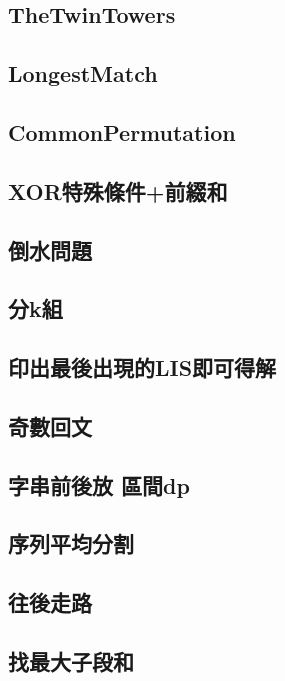 \subsection{TheTwinTowers}

\subsection{LongestMatch}

\subsection{CommonPermutation}

\subsection{XOR特殊條件+前綴和}

\subsection{倒水問題}

\subsection{分k組}

\subsection{印出最後出現的LIS即可得解}

\subsection{奇數回文}

\subsection{字串前後放 區間dp}

\subsection{序列平均分割}

\subsection{往後走路}

\subsection{找最大子段和}

